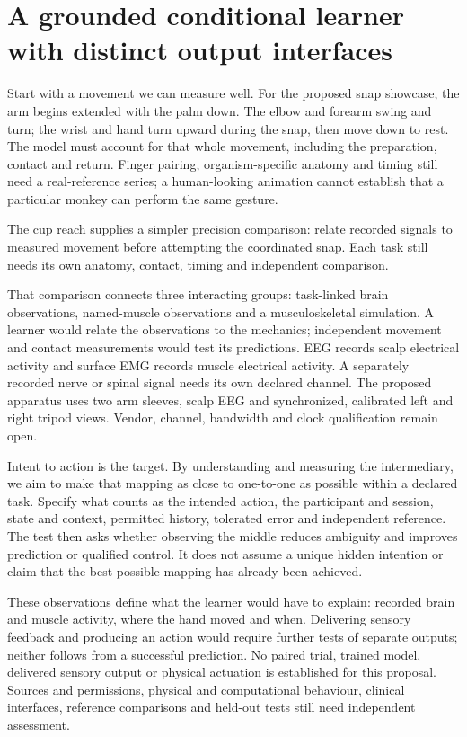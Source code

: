 \section{A grounded conditional learner with distinct output interfaces}
Start with a movement we can measure well. For the proposed snap showcase,
the arm begins extended with the palm down. The elbow and forearm swing and
turn; the wrist and hand turn upward during the snap, then move down to rest.
The model must account for that whole movement, including the preparation,
contact and return. Finger pairing, organism-specific anatomy and timing still
need a real-reference series; a human-looking animation cannot establish that
a particular monkey can perform the same gesture.

The cup reach supplies a simpler precision comparison: relate recorded signals
to measured movement before attempting the coordinated snap. Each task still
needs its own anatomy, contact, timing and independent comparison.

That comparison connects three interacting groups: task-linked brain
observations, named-muscle observations and a musculoskeletal simulation.
A learner would relate the observations to the mechanics; independent movement
and contact measurements would test its predictions. EEG records scalp
electrical activity and surface EMG records muscle electrical activity.
A separately recorded nerve or spinal signal needs its own declared channel.
The proposed apparatus uses two arm sleeves, scalp EEG and synchronized,
calibrated left and right tripod views. Vendor, channel, bandwidth and clock
qualification remain open.

Intent to action is the target. By understanding and measuring the intermediary,
we aim to make that mapping as close to one-to-one as possible within a declared
task. Specify what counts as the intended action, the participant and session,
state and context, permitted history, tolerated error and independent reference.
The test then asks whether observing the middle reduces ambiguity and improves
prediction or qualified control. It does not assume a unique hidden intention
or claim that the best possible mapping has already been achieved.

These observations define what the learner would have to explain: recorded
brain and muscle activity, where the hand moved and when. Delivering sensory
feedback and producing an action would require further tests of separate
outputs; neither follows from a successful prediction. No paired trial, trained
model, delivered sensory output or physical actuation is established for this
proposal. Sources and permissions, physical and computational behaviour,
clinical interfaces, reference comparisons and held-out tests still need
independent assessment.

